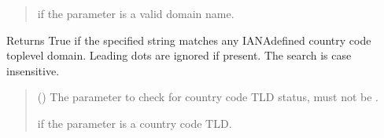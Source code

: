 \documentclass[letterpaper,10pt,english]{sphinxmanual}
\begin{document}
\begin{fulllineitems}
\begin{fulllineitems}
\begin{quote}
\begin{description}
\sphinxAtStartPar
{} if the parameter is a valid domain name.

\end{description}\end{quote}

\end{fulllineitems}


\begin{fulllineitems}
\label{\detokenize{apache_commons_validator_python.routines:apache_commons_validator_python.routines.domain_validator.DomainValidator.is_valid_country_code_tld}}
\pysigstartsignatures
{}
\pysigstopsignatures
\sphinxAtStartPar
Returns True if the specified string matches any IANA\sphinxhyphen{}defined country code
top\sphinxhyphen{}level domain. Leading dots are ignored if present. The search is case\sphinxhyphen{}
insensitive.
\begin{quote}\begin{description}
\sphinxAtStartPar
{} () \textendash{} The parameter to check for country code TLD status, must not be .

\sphinxAtStartPar
{} if the parameter is a country code TLD.

\end{description}\end{quote}

\end{fulllineitems}



\end{fulllineitems}
\end{document}
